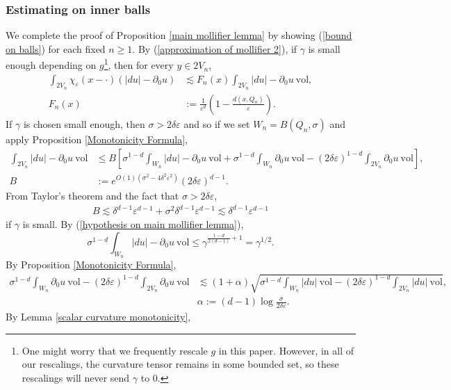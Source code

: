 \documentclass[reqno,12pt,letterpaper]{amsart}
\newcommand{\vol}{\mathrm{vol}}
\theoremstyle{definition}
\numberwithin{equation}{section}
\begin{document}
\subsubsection{Estimating on inner balls}
We complete the proof of Proposition \ref{main mollifier lemma} by showing (\ref{bound on balls}) for each fixed $n \geq 1$.
By (\ref{approximation of mollifier 2}), if $\gamma$ is small enough depending on $g$\footnote{One might worry that we frequently rescale $g$ in this paper.
However, in all of our rescalings, the curvature tensor remains in some bounded set, so these rescalings will never send $\gamma$ to $0$.}, then for every $y \in 2V_n$,
\begin{align*}
\int_{2V_n} \chi_\varepsilon(x - \cdot)(|du| - \partial_0u) &\lesssim F_n(x) \int_{2V_n} |du| - \partial_0u ~\vol, \\
F_n(x) &:= \frac{1}{\varepsilon^d}\left(1 - \frac{d(x, Q_n)}{\varepsilon}\right).
\end{align*}
If $\gamma$ is chosen small enough, then $\sigma > 2\delta\varepsilon$ and so if we set $W_n = B(Q_n, \sigma)$ and apply Proposition \ref{Monotonicity Formula},
\begin{align*}
\int_{2V_n}|du| - \partial_0u ~\vol &\leq
B \left[\sigma^{1 - d}\int_{W_n} |du| - \partial_0u ~\vol + \sigma^{1 - d}\int_{W_n} \partial_0u ~\vol - (2\delta\varepsilon)^{1 - d}\int_{2V_n} \partial_0u ~\vol \right],\\
B &:= e^{O(1)(\sigma^2 - 4\delta^2\varepsilon^2)}(2\delta\varepsilon)^{d - 1}.
\end{align*}
From Taylor's theorem and the fact that $\sigma > 2\delta\varepsilon$,
\begin{align*}
B \lesssim \delta^{d - 1} \varepsilon^{d - 1} + \sigma^2 \delta^{d - 1} \varepsilon^{d - 1} \lesssim \delta^{d - 1} \varepsilon^{d - 1}
\end{align*}
if $\gamma$ is small.
By (\ref{hypothesis on main mollifier lemma}),
$$\sigma^{1 - d}\int_{W_n} |du| - \partial_0u ~\vol \leq \gamma^{\frac{1 - d}{2(d - 1)} + 1} = \gamma^{1/2}.$$
By Proposition \ref{Monotonicity Formula},
\begin{align*}
\sigma^{1 - d}\int_{W_n} \partial_0u ~\vol - (2\delta\varepsilon)^{1 - d}\int_{2V_n} \partial_0u ~\vol &\lesssim (1 + \alpha)\sqrt{\sigma^{1 - d} \int_{W_n} |du| ~\vol - (2\delta\varepsilon)^{1 - d} \int_{2V_n} |du| ~\vol},\\
&\alpha := (d - 1)\log \frac{\sigma}{2\delta\varepsilon}.
\end{align*}
By Lemma \ref{scalar curvature monotonicity},
\end{document}
